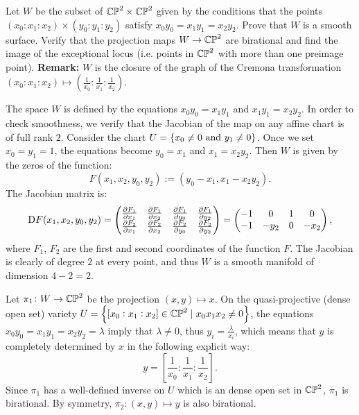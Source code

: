 \documentclass[11pt, a4paper]{article}
\begin{document}
\begin{exercise}
  Let $W$ be the subset of $\mathbb{CP}^2 \times \mathbb{CP}^2$ given by the conditions
  that the points $(x_0 : x_1 : x_2) \times (y_0 : y_1 : y_2)$
  satisfy $x_0 y_0 = x_1 y_1 = x_2 y_2$.
  Prove that $W$ is a smooth surface.
  Verify that the projection maps $W \to \mathbb{CP}^2$ are birational
  and find the image of the exceptional locus (i.e. points
  in $\mathbb{CP}^2$ with more than one preimage point).
  \textbf{Remark:} $W$ is the closure of the graph of the Cremona transformation
  $(x_0 : x_1 : x_2) \mapsto (\frac{1}{x_0} : \frac{1}{x_1} : \frac{1}{x_2})$.
\end{exercise}
\begin{solution}
  The space $W$ is defined by the equations $x_0 y_0 = x_1 y_1$ and
  $x_1 y_1 = x_2 y_2$.
  In order to check smoothness, we verify that the Jacobian of the map
  on any affine chart is of full rank $2$.
  Consider the chart $U = \left\{x_0 \neq 0 \text{ and } y_1 \neq 0\right\}$.
  Once we set $x_0 = y_1 = 1$, the equations become
  $y_0 = x_1$ and $x_1 = x_2 y_2$.
  Then $W$ is given by the zeros of the function:
  \[
    F(x_1,x_2,y_0,y_2) := (y_0 - x_1, x_1 - x_2 y_2).
  \]
  The Jacobian matrix is:
  \[
    \mathrm{D} F(x_1,x_2,y_0,y_2) =
    \begin{pmatrix}
      \frac{\partial F_1}{\partial x_1} &
      \frac{\partial F_1}{\partial x_2} &
      \frac{\partial F_1}{\partial y_0} &
      \frac{\partial F_1}{\partial y_2} \\
      \frac{\partial F_2}{\partial x_1} &
      \frac{\partial F_2}{\partial x_2} &
      \frac{\partial F_2}{\partial y_0} &
      \frac{\partial F_2}{\partial y_2}
    \end{pmatrix} =
    \begin{pmatrix}
      -1 & 0 & 1 & 0 \\
      -1 & -y_2 & 0 & -x_2
    \end{pmatrix},
  \]
  where $F_1$, $F_2$ are the first and second coordinates of the function $F$.
  The Jacobian is clearly of degree $2$ at every point,
  and thus $W$ is a smooth manifold of dimension $4 - 2 = 2$.

  Let $\pi_1 \colon W \to \mathbb{CP}^2$ be the projection $(x,y) \mapsto x$.
  On the quasi-projective (dense open set) variety $U = \left\{[x_0 : x_1 : x_2] \in \mathbb{CP}^2 \mid
  x_0 x_1 x_2 \neq 0\right\}$,
  the equations $x_0 y_0 = x_1 y_1 = x_2 y_2 = \lambda$ imply that $\lambda \neq 0$,
  thus $y_i = \frac{\lambda}{x_i}$, which means that $y$ is completely
  determined by $x$ in the following explicit way:
  \[
    y = [\frac{1}{x_0} : \frac{1}{x_1} : \frac{1}{x_2}].
  \]
  Since $\pi_1$ has a well-defined inverse on $U$ which is an dense open
  set in $\mathbb{CP}^2$, $\pi_1$ is birational.
  By symmetry, $\pi_2 \colon (x,y) \mapsto y$ is also birational.


\end{solution}
\end{document}
